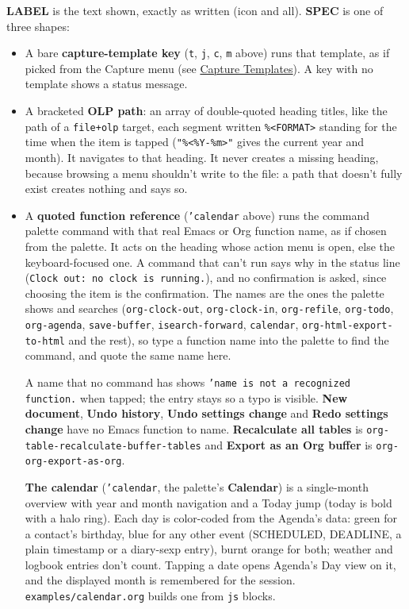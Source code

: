 \documentclass[11pt]{article}
\begin{document}
\textbf{LABEL} is the text shown, exactly as written (icon and all). \textbf{SPEC} is one of three shapes:

\begin{itemize}
\item A bare \textbf{capture-template key} (\texttt{t}, \texttt{j}, \texttt{c}, \texttt{m} above) runs that template, as if picked from the Capture menu (see \hyperref[sec:org0116725]{Capture Templates}). A key with no template shows a status message.
\item A bracketed \textbf{OLP path}: an array of double-quoted heading titles, like the path of a \texttt{file+olp} target, each segment written \texttt{\%<FORMAT>} standing for the time when the item is tapped (\texttt{"\%<\%Y-\%m>"} gives the current year and month). It navigates to that heading. It never creates a missing heading, because browsing a menu shouldn't write to the file: a path that doesn't fully exist creates nothing and says so.
\item A \textbf{quoted function reference} (\texttt{'calendar} above) runs the command palette command with that real Emacs or Org function name, as if chosen from the palette. It acts on the heading whose action menu is open, else the keyboard-focused one. A command that can't run says why in the status line (\texttt{Clock out: no clock is running.}), and no confirmation is asked, since choosing the item is the confirmation. The names are the ones the palette shows and searches (\texttt{org-clock-out}, \texttt{org-clock-in}, \texttt{org-refile}, \texttt{org-todo}, \texttt{org-agenda}, \texttt{save-buffer}, \texttt{isearch-forward}, \texttt{calendar}, \texttt{org-html-export-to-html} and the rest), so type a function name into the palette to find the command, and quote the same name here.

A name that no command has shows \texttt{'name is not a recognized function.} when tapped; the entry stays so a typo is visible. \textbf{New document}, \textbf{Undo history}, \textbf{Undo settings change} and \textbf{Redo settings change} have no Emacs function to name. \textbf{Recalculate all tables} is \texttt{org-table-recalculate-buffer-tables} and \textbf{Export as an Org buffer} is \texttt{org-org-export-as-org}.

\textbf{The calendar} (\texttt{'calendar}, the palette's \textbf{Calendar}) is a single-month overview with year and month navigation and a Today jump (today is bold with a halo ring). Each day is color-coded from the Agenda's data: green for a contact's birthday, blue for any other event (SCHEDULED, DEADLINE, a plain timestamp or a diary-sexp entry), burnt orange for both; weather and logbook entries don't count. Tapping a date opens Agenda's Day view on it, and the displayed month is remembered for the session. \texttt{examples/calendar.org} builds one from \texttt{js} blocks.
\end{itemize}
\end{document}
